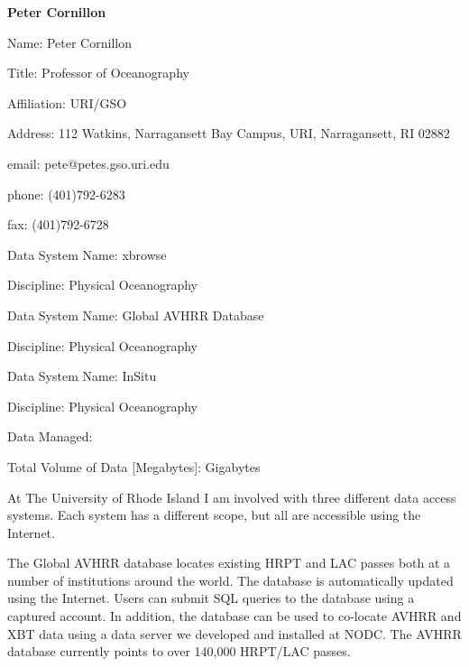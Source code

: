 \begin{center}
\LARGE
{\bf  Peter Cornillon}
\end{center}
\large
{}
\normalsize
\smallskip
\begin{description}
\item{Name:}  Peter Cornillon
\item{Title:}  Professor of Oceanography
\item{Affiliation:}  URI/GSO
\item{Address:}  112 Watkins, Narragansett Bay Campus, URI, 
Narragansett, RI  02882
\item{email:}  pete@petes.gso.uri.edu
\item{phone:}  (401)792-6283
\item{fax:}  (401)792-6728
\end{description}
\medskip
\large
{}
\normalsize
\medskip
\begin{description}

\item{Data System Name:}  xbrowse
\item{Discipline:}  Physical Oceanography
\medskip
\item{Data System Name:}  Global AVHRR Database
\item{Discipline:}  Physical Oceanography
\medskip
\item{Data System Name:}  InSitu
\item{Discipline:}  Physical Oceanography

\item{Data Managed:}
	\begin{description}
	\item{Total Volume of Data [Megabytes]:}  Gigabytes
	\end{description}
\end{description}

\medskip
\large
{}
\normalsize
\medskip

	At The University of Rhode Island I am involved with three different 
data access systems.  Each system has a different scope, but all are 
accessible using the Internet.

	The Global AVHRR database locates existing HRPT and LAC passes 
both at a number of institutions around the world.  The database is 
automatically updated using the Internet.  Users can submit SQL queries to 
the database using a captured account.  In addition, the database can be 
used to co-locate AVHRR and XBT data using a data server we developed 
and installed at NODC.  The AVHRR database currently points to over 
140,000 HRPT/LAC passes.

